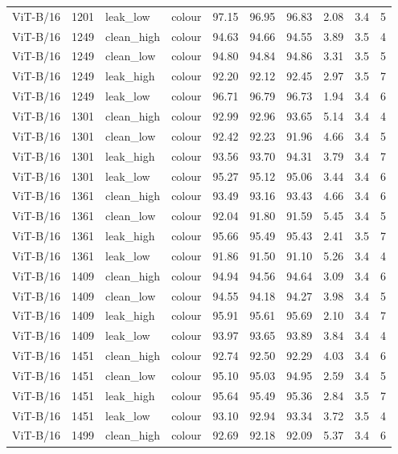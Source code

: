 {\begin{longtable}{lrllrrrrrr}
ViT-B/16 & 1201 & leak\_low & colour & 97.15 & 96.95 & 96.83 & 2.08 & 3.4 & 5 \\
ViT-B/16 & 1249 & clean\_high & colour & 94.63 & 94.66 & 94.55 & 3.89 & 3.5 & 4 \\
ViT-B/16 & 1249 & clean\_low & colour & 94.80 & 94.84 & 94.86 & 3.31 & 3.5 & 5 \\
ViT-B/16 & 1249 & leak\_high & colour & 92.20 & 92.12 & 92.45 & 2.97 & 3.5 & 7 \\
ViT-B/16 & 1249 & leak\_low & colour & 96.71 & 96.79 & 96.73 & 1.94 & 3.4 & 6 \\
ViT-B/16 & 1301 & clean\_high & colour & 92.99 & 92.96 & 93.65 & 5.14 & 3.4 & 4 \\
ViT-B/16 & 1301 & clean\_low & colour & 92.42 & 92.23 & 91.96 & 4.66 & 3.4 & 5 \\
ViT-B/16 & 1301 & leak\_high & colour & 93.56 & 93.70 & 94.31 & 3.79 & 3.4 & 7 \\
ViT-B/16 & 1301 & leak\_low & colour & 95.27 & 95.12 & 95.06 & 3.44 & 3.4 & 6 \\
ViT-B/16 & 1361 & clean\_high & colour & 93.49 & 93.16 & 93.43 & 4.66 & 3.4 & 6 \\
ViT-B/16 & 1361 & clean\_low & colour & 92.04 & 91.80 & 91.59 & 5.45 & 3.4 & 5 \\
ViT-B/16 & 1361 & leak\_high & colour & 95.66 & 95.49 & 95.43 & 2.41 & 3.5 & 7 \\
ViT-B/16 & 1361 & leak\_low & colour & 91.86 & 91.50 & 91.10 & 5.26 & 3.4 & 4 \\
ViT-B/16 & 1409 & clean\_high & colour & 94.94 & 94.56 & 94.64 & 3.09 & 3.4 & 6 \\
ViT-B/16 & 1409 & clean\_low & colour & 94.55 & 94.18 & 94.27 & 3.98 & 3.4 & 5 \\
ViT-B/16 & 1409 & leak\_high & colour & 95.91 & 95.61 & 95.69 & 2.10 & 3.4 & 7 \\
ViT-B/16 & 1409 & leak\_low & colour & 93.97 & 93.65 & 93.89 & 3.84 & 3.4 & 4 \\
ViT-B/16 & 1451 & clean\_high & colour & 92.74 & 92.50 & 92.29 & 4.03 & 3.4 & 6 \\
ViT-B/16 & 1451 & clean\_low & colour & 95.10 & 95.03 & 94.95 & 2.59 & 3.4 & 5 \\
ViT-B/16 & 1451 & leak\_high & colour & 95.64 & 95.49 & 95.36 & 2.84 & 3.5 & 7 \\
ViT-B/16 & 1451 & leak\_low & colour & 93.10 & 92.94 & 93.34 & 3.72 & 3.5 & 4 \\
ViT-B/16 & 1499 & clean\_high & colour & 92.69 & 92.18 & 92.09 & 5.37 & 3.4 & 6 \\

\end{longtable}}
